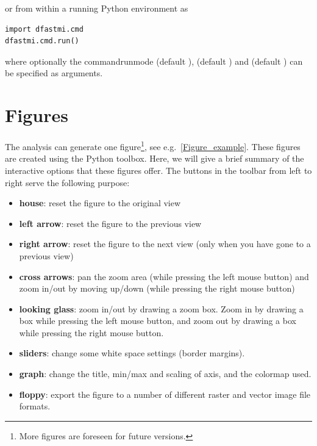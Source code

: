 or from within a running Python environment as

\begin{Verbatim}
import dfastmi.cmd
dfastmi.cmd.run()
\end{Verbatim}

where optionally the command{runmode} (default ),  (default ) and  (default ) can be specified as arguments.

\section{Figures}\label{Sec:FigNavigation}

The analysis can generate one figure\footnote{More figures are foreseen for future versions.}, see e.g.~\autoref{Figure_example}.
These figures are created using the Python  toolbox.
Here, we will give a brief summary of the interactive options that these figures offer.
The buttons in the toolbar from left to right serve the following purpose:

\begin{itemize}
\item \textbf{house}: reset the figure to the original view
\item \textbf{left arrow}: reset the figure to the previous view
\item \textbf{right arrow}: reset the figure to the next view (only when you have gone to a previous view)
\item \textbf{cross arrows}: pan the zoom area (while pressing the left mouse button) and zoom in/out by moving up/down (while pressing the right mouse button)
\item \textbf{looking glass}: zoom in/out by drawing a zoom box. Zoom in by drawing a box while pressing the left mouse button, and zoom out by drawing a box while pressing the right mouse button.
\item \textbf{sliders}: change some white space settings (border margins).
\item \textbf{graph}: change the title, min/max and scaling of axis, and the colormap used.
\item \textbf{floppy}: export the figure to a number of different raster and vector image file formats.
\end{itemize}

